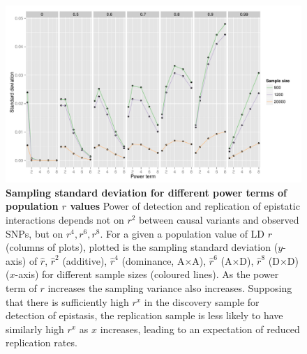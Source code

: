 \documentclass{article}
\begin{document}
\begin{figure}
	\centering
	\includegraphics[width=5in]{ld_sampling_sd}
	\caption{\textbf{Sampling standard deviation for different power terms of population $r$ values} Power of detection and replication of epistatic interactions depends not on $r^2$ between causal variants and observed SNPs, but on $r^4, r^6, r^8$. For a given a population value of LD $r$ (columns of plots), plotted is the sampling standard deviation ($y$-axis) of $\hat{r}$, $\hat{r}^2$ (additive), $\hat{r}^4$ (dominance, A$\times$A), $\hat{r}^6$ (A$\times$D), $\hat{r}^8$ (D$\times$D) ($x$-axis) for different sample sizes (coloured lines). As the power term of $r$ increases the sampling variance also increases. Supposing that there is sufficiently high $r^x$ in the discovery sample for detection of epistasis, the replication sample is less likely to have similarly high $r^x$ as $x$ increases, leading to an expectation of reduced replication rates.}
	\label{fig:ld_sampling_sd}
\end{figure}
\clearpage
\end{document}
